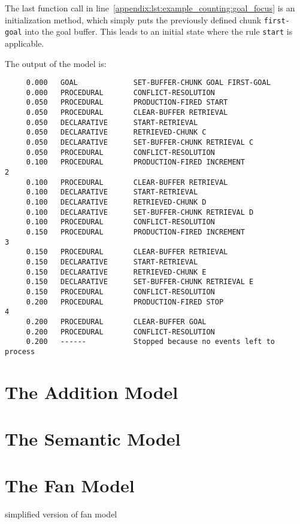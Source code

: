 The last function call in line~\ref{appendix:lst:example_counting:goal_focus} is an initialization method, which simply puts the previously defined chunk \lstinline|first-goal| into the goal buffer. This leads to an initial state where the rule \lstinline|start| is applicable.

The output of the model is:

\begin{lstlisting}
     0.000   GOAL             SET-BUFFER-CHUNK GOAL FIRST-GOAL 
     0.000   PROCEDURAL       CONFLICT-RESOLUTION 
     0.050   PROCEDURAL       PRODUCTION-FIRED START 
     0.050   PROCEDURAL       CLEAR-BUFFER RETRIEVAL 
     0.050   DECLARATIVE      START-RETRIEVAL 
     0.050   DECLARATIVE      RETRIEVED-CHUNK C 
     0.050   DECLARATIVE      SET-BUFFER-CHUNK RETRIEVAL C 
     0.050   PROCEDURAL       CONFLICT-RESOLUTION 
     0.100   PROCEDURAL       PRODUCTION-FIRED INCREMENT 
2 
     0.100   PROCEDURAL       CLEAR-BUFFER RETRIEVAL 
     0.100   DECLARATIVE      START-RETRIEVAL 
     0.100   DECLARATIVE      RETRIEVED-CHUNK D 
     0.100   DECLARATIVE      SET-BUFFER-CHUNK RETRIEVAL D 
     0.100   PROCEDURAL       CONFLICT-RESOLUTION 
     0.150   PROCEDURAL       PRODUCTION-FIRED INCREMENT 
3 
     0.150   PROCEDURAL       CLEAR-BUFFER RETRIEVAL 
     0.150   DECLARATIVE      START-RETRIEVAL 
     0.150   DECLARATIVE      RETRIEVED-CHUNK E 
     0.150   DECLARATIVE      SET-BUFFER-CHUNK RETRIEVAL E 
     0.150   PROCEDURAL       CONFLICT-RESOLUTION 
     0.200   PROCEDURAL       PRODUCTION-FIRED STOP 
4 
     0.200   PROCEDURAL       CLEAR-BUFFER GOAL 
     0.200   PROCEDURAL       CONFLICT-RESOLUTION 
     0.200   ------           Stopped because no events left to process 
\end{lstlisting}



\section{The Addition Model}

\section{The Semantic Model}

\section{The Fan Model}

simplified version of fan model